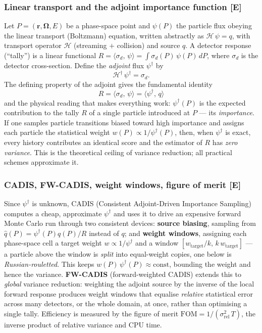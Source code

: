 \documentclass[a4paper,fleqn]{cas-sc}
\newcommand{\dg}{^{\dagger}}
\newcommand{\ip}[2]{\langle #1,\,#2\rangle}
\begin{document}
\subsubsection{Linear transport and the adjoint importance function \textbf{[E]}}
Let $P=(\mathbf r,\mathbf\Omega,E)$ be a phase-space point and $\psi(P)$ the particle flux
obeying the linear transport (Boltzmann) equation, written abstractly as $\mathcal H\,\psi
= q$, with transport operator $\mathcal H$ (streaming $+$ collision) and source $q$. A
detector response (``tally'') is a linear functional $R=\ip{\sigma_d}{\psi}=\int
\sigma_d(P)\,\psi(P)\,dP$, where $\sigma_d$ is the detector cross-section. Define the
\emph{adjoint} flux $\psi\dg$ by
\begin{equation}
	\mathcal H\dg\,\psi\dg=\sigma_d .
	\label{eq:adjoint}
\end{equation}
The defining property of the adjoint gives the fundamental identity
\begin{equation}
	\boxed{\;R=\ip{\sigma_d}{\psi}=\ip{\psi\dg}{q}\;}
	\label{eq:fund}
\end{equation}
and the physical reading that makes everything work: $\psi\dg(P)$ is the expected
contribution to the tally $R$ of a single particle introduced at $P$ --- its
\emph{importance}. If one samples particle transitions biased toward high importance and
assigns each particle the statistical weight $w(P)\propto 1/\psi\dg(P)$, then, when
$\psi\dg$ is exact, every history contributes an identical score and the estimator of $R$
has \emph{zero variance}. This is the theoretical ceiling of variance reduction; all
practical schemes approximate it.

\subsubsection{CADIS, FW-CADIS, weight windows, figure of merit \textbf{[E]}}
Since $\psi\dg$ is unknown, CADIS (Consistent Adjoint-Driven Importance Sampling) computes
a cheap, approximate $\psi\dg$ and uses it to drive an expensive forward Monte Carlo run
through two consistent devices: \textbf{source biasing}, sampling from
$\hat q(P)=\psi\dg(P)q(P)/R$ instead of $q$; and \textbf{weight windows}, assigning each
phase-space cell a target weight $w\propto 1/\psi\dg$ and a window
$[w_{\text{target}}/k,\,k\,w_{\text{target}}]$ --- a particle above the window is
\emph{split} into equal-weight copies, one below is \emph{Russian-rouletted}. This keeps
$w(P)\,\psi\dg(P)\approx\text{const}$, bounding the weight and hence the variance.
\textbf{FW-CADIS} (forward-weighted CADIS) extends this to \emph{global} variance
reduction: weighting the adjoint source by the inverse of the local forward response
produces weight windows that equalise \emph{relative} statistical error across many
detectors, or the whole domain, at once, rather than optimising a single tally. Efficiency
is measured by the figure of merit $\mathrm{FOM}=1/(\sigma_{\mathrm{rel}}^2\,T)$, the
inverse product of relative variance and CPU time.
\end{document}
